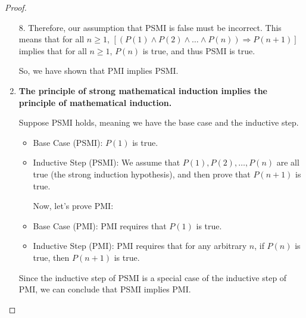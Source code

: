 \documentclass{article}
\newtheorem{proof}
\begin{document}
\begin{proof}
\begin{enumerate}
        8. Therefore, our assumption that PSMI is false must be incorrect. This means that for all $n \geq 1$, $[(P(1) \land P(2) \land \ldots \land P(n)) \Rightarrow P(n+1)]$ implies that for all $n \geq 1$, $P(n)$ is true, and thus PSMI is true.

So, we have shown that PMI implies PSMI.

	
		
		
	

        \item  \textbf{The principle of strong mathematical induction implies the principle of mathematical induction.}
        \vspace{2mm}

        Suppose PSMI holds, meaning we have the base case and the inductive step.
    \begin{itemize}
         
    
    \item Base Case (PSMI): $P(1)$ is true.

    \item Inductive Step (PSMI): We assume that $P(1), P(2), \ldots, P(n)$ are all true (the strong induction hypothesis), and then prove that $P(n + 1)$ is true.

    Now, let's prove PMI:

    \item Base Case (PMI): PMI requires that $P(1)$ is true.

    \item Inductive Step (PMI): PMI requires that for any arbitrary $n$, if $P(n)$ is true, then $P(n + 1)$ is true.
    \end{itemize}
    Since the inductive step of PSMI is a special case of the inductive step of PMI, we can conclude that PSMI implies PMI.

    \end{enumerate}
    \end{proof}
\end{document}
